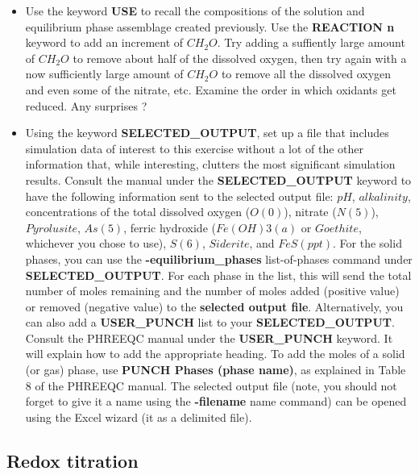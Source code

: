 \begin{itemize}
\item Use the keyword {\color{red} \textbf{USE}} to recall the compositions 
of the solution and equilibrium phase assemblage created previously.  
Use the {\color{red} \textbf{REACTION n}} keyword to add an increment of $CH_2O$.  
Try adding a suffiently large amount of $CH_2O$ to remove about half of the dissolved oxygen, 
then try again with a now sufficiently large amount of $CH_2O$ 
to remove all the dissolved oxygen and even some of the nitrate, etc.  
Examine the order in which oxidants get reduced. Any surprises ?

\item Using the keyword {\color{red} \textbf{SELECTED\_OUTPUT}}, 
set up a file that includes simulation data of interest to this exercise 
without a lot of the other information that, while interesting, 
clutters the most significant simulation results.  
Consult the manual under the {\color{red} \textbf{SELECTED\_OUTPUT}} 
keyword to have the following information sent to the selected output file: 
$pH$, $alkalinity$, concentrations of the total dissolved oxygen ($O(0)$), nitrate ($N(5)$), 
$Pyrolusite$, $As(5)$, ferric hydroxide ($Fe(OH)3(a)$ or $Goethite$, 
whichever you chose to use), $S(6)$, $Siderite$, and $FeS(ppt)$.  
For the solid phases, you can use the {\color{red} \textbf{-equilibrium\_phases}} 
list-of-phases command under {\color{red} \textbf{SELECTED\_OUTPUT}}.  
For each phase in the list, this will send the total number of moles 
remaining and the number of moles added (positive value) or removed (negative value) 
to the {\color{red} \textbf{selected output file}}.  
Alternatively, you can also add a {\color{red} \textbf{USER\_PUNCH}} 
list to your {\color{red} \textbf{SELECTED\_OUTPUT}}.  
Consult the PHREEQC manual under the {\color{red} \textbf{USER\_PUNCH}} keyword.  
It will explain how to add the appropriate heading.
To add the moles of a solid (or gas) phase, use 
{\color{red} \textbf{PUNCH Phases (phase name)}}, %
as explained in Table 8 of the PHREEQC manual.  
The selected output file (note, you should not forget to give it a name 
using the {\color{red} \textbf{-filename}} 
name command) can be opened using the Excel wizard 
(it as a delimited file).

\end{itemize}

\subsection[Redox titration]{Redox titration}

